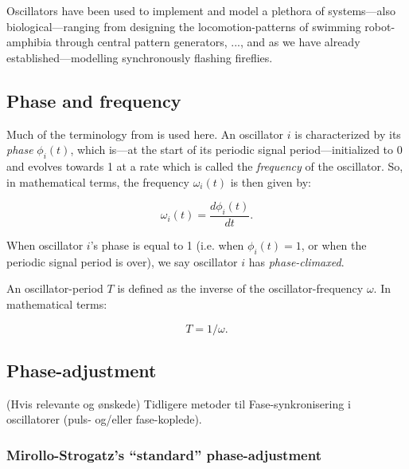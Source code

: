 	Oscillators have been used to implement and model a plethora of systems—also biological—ranging from designing the locomotion-patterns of swimming robot-amphibia through central pattern generators\cite{Ijspeert}, ..., and as we have already established—modelling synchronously flashing fireflies.
	
	\subsection{Phase and frequency}
	
	Much of the terminology from \cite{nymoen_synch} is used here. An oscillator $i$ is characterized by its \textit{phase} $\phi_i(t)$, which is—at the start of its periodic signal period—initialized to 0 and evolves towards 1 at a rate which is called the \textit{frequency} of the oscillator. So, in mathematical terms, the frequency $\omega_i(t)$ is then given by:
	
	\begin{equation}
	\label{phase_freq}
		\omega_i(t) = \frac{d \phi_i(t)}{d t} .
	\end{equation}

	When oscillator $i$'s phase is equal to 1 (i.e. when $\phi_i(t)=1$, or when the periodic signal period is over), we say oscillator $i$ has \textit{phase-climaxed}.
	
	An oscillator-period $T$ is defined as the inverse of the oscillator-frequency $\omega$. In mathematical terms:
	
	\begin{equation}
	\label{period_freq}
		T = 1/\omega .
	\end{equation}
	
	\subsection{Phase-adjustment}
	
	
	(Hvis relevante og ønskede) \nl
	Tidligere metoder til Fase-synkronisering i oscillatorer (puls- og/eller fase-koplede).
	
	\subsubsection{Mirollo-Strogatz's ``standard'' phase-adjustment} %
	\label{mirollo_strogatz_phase_adjust}
	
